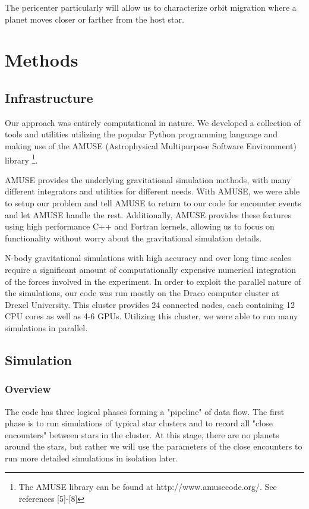 \documentclass[12pt]{article}
\begin{document}
    The pericenter particularly will allow us to characterize orbit migration where a
    planet moves closer or farther from the host star.

\section{Methods}

    \subsection{Infrastructure}

    Our approach was entirely computational in nature. We developed a collection of tools
    and utilities utilizing the popular Python programming language and making use
    of the AMUSE (Astrophysical Multipurpose Software Environment) library \footnote{The AMUSE library can be found at http://www.amusecode.org/. See references [5]-[8]}. 

    AMUSE provides the underlying gravitational simulation methods, with many different
    integrators and utilities for different needs. With AMUSE, we were able to 
    setup our problem and tell AMUSE to return to our code for encounter events and
    let AMUSE handle the rest. Additionally, AMUSE provides these features using high
    performance C++ and Fortran kernels, allowing us to focus on functionality without
    worry about the gravitational simulation details.

    N-body gravitational simulations with high accuracy and over long time scales require
    a significant amount of computationally expensive numerical integration of the 
    forces involved in the experiment. In order to exploit the parallel nature of 
    the simulations, our code was run mostly on the Draco computer 
    cluster at Drexel University. This cluster provides 24 connected nodes, each containing
    12 CPU cores as well as 4-6 GPUs. Utilizing this cluster, we were able to run many simulations in parallel.

    \subsection{Simulation}

    \subsubsection{Overview}

    The code has three logical phases forming a "pipeline" of data flow. 
    The first phase is to run simulations of typical
    star clusters and to record all "close encounters" between stars in the cluster.
    At this stage, there are no planets around the stars, but rather we will use the
    parameters of the close encounters to run more detailed simulations in isolation
    later.
\end{document}

